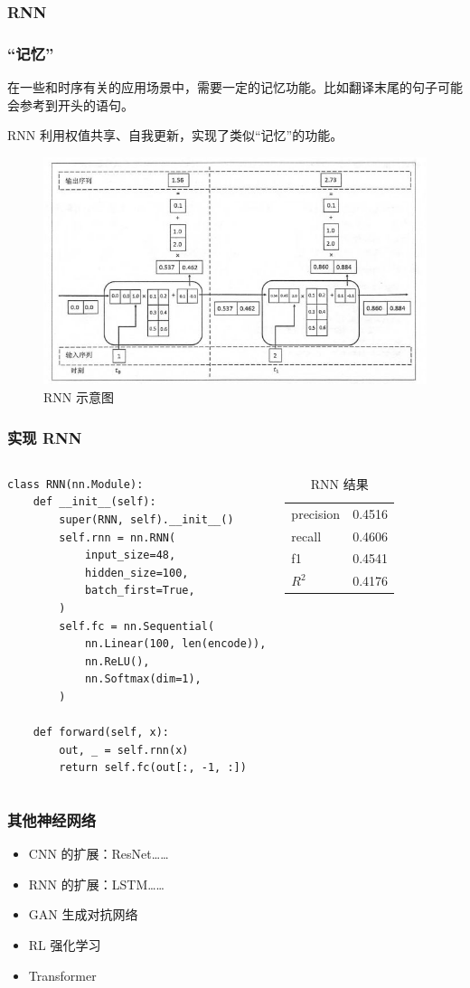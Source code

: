 \documentclass[mathserif,envcountsect,fontset=mac]{ctexbeamer}
\begin{document}
\subsubsection{RNN}
\begin{frame}
    \frametitle{“记忆”}
    在一些和时序有关的应用场景中，需要一定的记忆功能。比如翻译末尾的句子可能会参考到开头的语句。

    RNN 利用权值共享、自我更新，实现了类似“记忆”的功能。
    \begin{figure}
        \includegraphics[width=0.6\linewidth]{../lib/RNN.jpeg}
        \caption{RNN 示意图}
        \label{RNN}
    \end{figure}
\end{frame}
\begin{frame}[fragile]
    \frametitle{实现 RNN}
    \begin{columns}
        \begin{verbatim}
class RNN(nn.Module):
    def __init__(self):
        super(RNN, self).__init__()
        self.rnn = nn.RNN(
            input_size=48,
            hidden_size=100,
            batch_first=True,
        )
        self.fc = nn.Sequential(
            nn.Linear(100, len(encode)),
            nn.ReLU(),
            nn.Softmax(dim=1),
        )

    def forward(self, x):
        out, _ = self.rnn(x)
        return self.fc(out[:, -1, :])
        \end{verbatim}
        \begin{table}
            \caption{RNN 结果}
            \begin{tabular}{ll}
                precision & 0.4516 \\
                recall    & 0.4606 \\
                f1        & 0.4541 \\
                \(R^2\)   & 0.4176 \\
            \end{tabular}
            \label{RNNres}
        \end{table}
    \end{columns}
\end{frame}
\begin{frame}
    \frametitle{其他神经网络}
    \begin{itemize}
        \item CNN 的扩展：ResNet……
        \item RNN 的扩展：LSTM……
        \item GAN 生成对抗网络
        \item RL 强化学习
        \item Transformer
    \end{itemize}
\end{frame}
\end{document}
